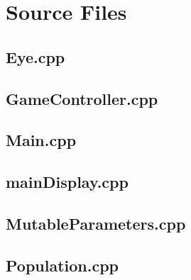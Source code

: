 \section{Source Files}


\newpage
\subsection{Eye.cpp}


\newpage
\subsection{GameController.cpp}


\newpage
\subsection{Main.cpp}


\newpage
\subsection{mainDisplay.cpp}


\newpage
\subsection{MutableParameters.cpp}


\newpage
\subsection{Population.cpp}
